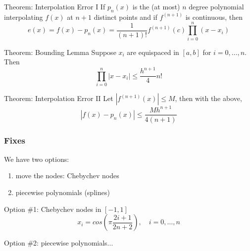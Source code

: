 \documentclass[10pt]{beamer}
\begin{document}
\begin{frame}
\vspace{-0.5cm}
\begin{block}{Theorem: Interpolation Error I}
  If $p_n(x)$ is the (at most) $n$ degree polynomial interpolating $f(x)$ at
$n+1$ distinct points and if $f^{(n+1)}$ is continuous, then 
\begin{equation*}
  e(x) = f(x) - p_n(x) = \frac{1}{(n+1)!} f^{(n+1)}(c) \prod_{i=0}^{n}(x-x_i)
\end{equation*}
\end{block}

\begin{block}{Theorem: Bounding Lemma}
Suppose $x_i$ are equispaced in $[a,b]$ for $i=0,\dots,n$.  Then
\begin{equation*}
  \prod_{i=0}^n |x-x_i| \leq \frac{h^{n+1}}{4} n!
\end{equation*}
\end{block}

\begin{block}{Theorem: Interpolation Error II}
Let $|f^{(n+1)}(x)|\leq M$, then with the above,
\begin{equation*}
  |f(x) - p_n(x)| \leq \frac{M h^{n+1}}{4(n+1)}
\end{equation*}
\end{block}
\end{frame}
\begin{frame}
\frametitle{Fixes}
We have two options:
\begin{enumerate}
  \item move the nodes: Chebychev nodes
  \item piecewise polynomials (splines)
\end{enumerate}
\bigskip
\bigskip

Option \#1: Chebychev nodes in $[-1,1]$
\begin{equation*}
  x_i = cos(\pi \frac{2i+1}{2n+2}), \quad i=0,\dots,n
\end{equation*}
\bigskip

Option \#2: piecewise polynomials...
\end{frame}
\end{document}
